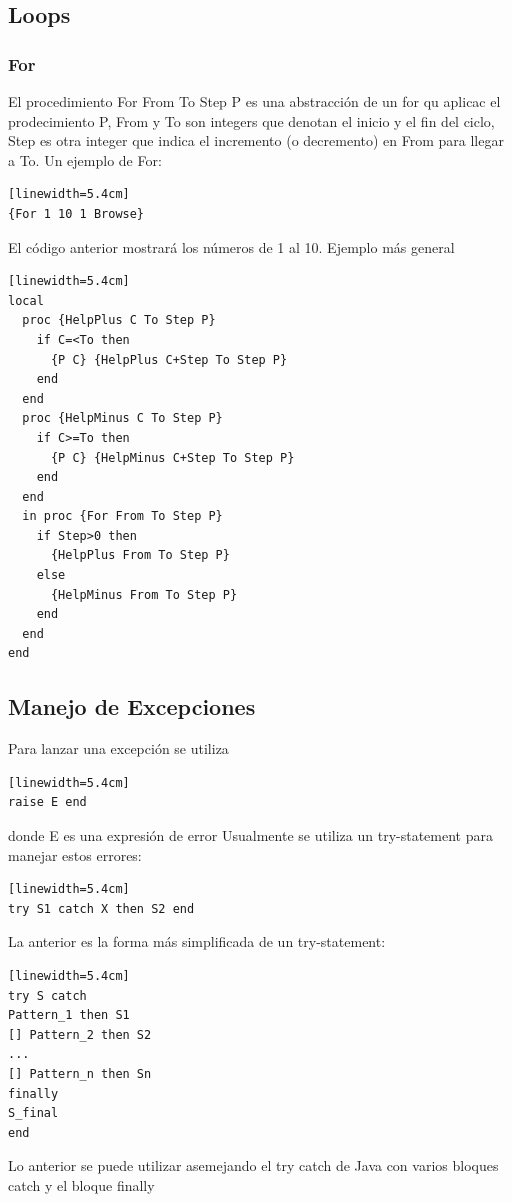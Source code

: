 \documentclass[10pt,journal,compsoc]{IEEEtran}
\begin{document}
\subsection{Loops}
\subsubsection{For}
El procedimiento {For From To Step P} es una abstracci\'on de un for qu aplicac el prodecimiento P, From y To son integers que denotan el inicio y el fin del ciclo, Step es otra integer que indica el incremento (o decremento) en From para llegar a To. Un ejemplo de For:
\begin{lstlisting}[language=Oz, caption = {For}][linewidth=5.4cm]
{For 1 10 1 Browse}
\end{lstlisting}
El c\'odigo anterior mostrar\'a los n\'umeros de 1 al 10. Ejemplo m\'as general
\begin{lstlisting}[language=Oz, caption = {For}][linewidth=5.4cm]
local 
  proc {HelpPlus C To Step P}
    if C=<To then 
      {P C} {HelpPlus C+Step To Step P} 
    end 
  end 
  proc {HelpMinus C To Step P}
    if C>=To then 
      {P C} {HelpMinus C+Step To Step P} 
    end 
  end 
  in proc {For From To Step P}
    if Step>0 then 
      {HelpPlus From To Step P}
    else 
      {HelpMinus From To Step P} 
    end 
  end 
end
\end{lstlisting}

\subsection{Manejo de Excepciones}
Para lanzar una excepci\'on se utiliza
\begin{lstlisting}[language=Oz, caption = {Variables en un scope}][linewidth=5.4cm]
raise E end
\end{lstlisting}
donde E es una expresi\'on de error
Usualmente se utiliza un try-statement para manejar estos errores:
\begin{lstlisting}[language=Oz, caption = {Variables en un scope}][linewidth=5.4cm]
try S1 catch X then S2 end
\end{lstlisting}
La anterior es la forma m\'as simplificada de un try-statement:
\begin{lstlisting}[language=Oz, caption = {Variables en un scope}][linewidth=5.4cm]
try S catch 
Pattern_1 then S1 
[] Pattern_2 then S2 
... 
[] Pattern_n then Sn 
finally 
S_final 
end
\end{lstlisting}
Lo anterior se puede utilizar asemejando el try catch de Java con varios bloques catch y el bloque finally
\end{document}
